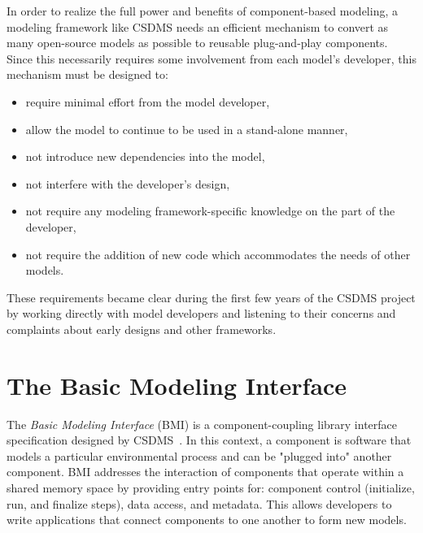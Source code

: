 \documentclass[11pt, oneside]{amsart}
\begin{document}
In order to realize the full power and benefits of component-based modeling, a
modeling framework like CSDMS needs an efficient mechanism to convert as many
open-source models as possible to reusable plug-and-play components. Since this
necessarily requires some involvement from each model's developer, this
mechanism must be designed to:

\begin{itemize}

\item require minimal effort from the model developer,

\item allow the model to continue to be used in a stand-alone manner,

\item not introduce new dependencies into the model,

\item not interfere with the developer's design,

\item not require any modeling framework-specific knowledge on the part of the
      developer,

\item not require the addition of new code which accommodates the needs of
      other models. 

\end{itemize}

These requirements became clear during the first few years of the CSDMS project
by working directly with model developers and listening to their concerns and
complaints about early designs and other frameworks.


\section{The Basic Modeling Interface}

The \emph{Basic Modeling Interface} (BMI) is a component-coupling library interface
specification designed by CSDMS~\cite{peckham2012component, syvitski2014plug}.
In this context, a component is software that models a particular environmental
process and can be "plugged into" another component. BMI addresses the
interaction of components that operate within a shared memory space by
providing entry points for: component control (initialize, run, and finalize
steps), data access, and metadata. This allows developers to write applications
that connect components to one another to form new models.
\end{document}
